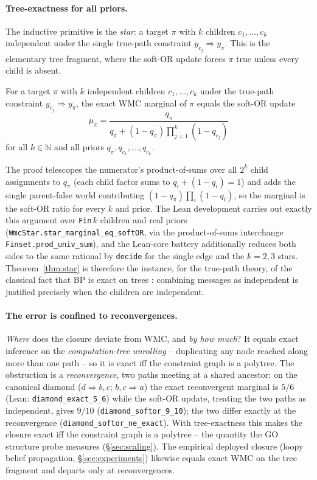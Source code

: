 \documentclass[anon]{nesy2026}
\begin{document}
\paragraph{Tree-exactness for all priors.}
The inductive primitive is the \emph{star}: a target $\pi$ with $k$ children $c_1,\dots,c_k$ independent under the single true-path constraint $y_{c_j}\!\Rightarrow\!y_\pi$. This is the elementary tree fragment, where the soft-OR update forces $\pi$ true unless every child is absent.

\begin{theorem}\label{thm:star}
For a target $\pi$ with $k$ independent children $c_1,\dots,c_k$ under the true-path constraint $y_{c_j}\!\Rightarrow\!y_\pi$, the exact WMC marginal of $\pi$ equals the soft-OR update
\[
\mu_\pi=\frac{q_\pi}{q_\pi+(1-q_\pi)\prod_{j=1}^{k}(1-q_{c_j})}
\]
for all $k\in\mathbb{N}$ and all priors $q_\pi,q_{c_1},\dots,q_{c_k}$.
\end{theorem}

The proof telescopes the numerator's product-of-sums over all $2^k$ child assignments to $q_\pi$ (each child factor sums to $q_i+(1-q_i)=1$) and adds the single parent-false world contributing $(1-q_\pi)\prod_i(1-q_i)$, so the marginal is the soft-OR ratio for every $k$ and prior. The Lean development carries out exactly this argument over \texttt{Fin}\,$k$ children and real priors (\texttt{WmcStar.star\_marginal\_eq\_softOR}, via the product-of-sums interchange \texttt{Finset.prod\_univ\_sum}), and the Lean-core battery additionally reduces both sides to the same rational by \texttt{decide} for the single edge and the $k{=}2,3$ stars. Theorem~\ref{thm:star} is therefore the instance, for the true-path theory, of the classical fact that BP is exact on trees \citep{pearl1988probabilistic}: combining messages as independent is justified precisely when the children are independent.

\paragraph{The error is confined to reconvergences.}
\emph{Where} does the closure deviate from WMC, and \emph{by how much}? It equals exact inference on the \emph{computation-tree unrolling} -- duplicating any node reached along more than one path -- so it is exact iff the constraint graph is a polytree. The obstruction is a \emph{reconvergence}, two paths meeting at a shared ancestor: on the canonical diamond ($d\!\Rightarrow\!b,c$; $b,c\!\Rightarrow\!a$) the exact reconvergent marginal is $5/6$ (Lean: \texttt{diamond\_exact\_5\_6}) while the soft-OR update, treating the two paths as independent, gives $9/10$ (\texttt{diamond\_softor\_9\_10}); the two differ exactly at the reconvergence (\texttt{diamond\_softor\_ne\_exact}). With tree-exactness this makes the closure exact iff the constraint graph is a polytree -- the quantity the GO structure probe measures (\S\ref{sec:scaling}). The empirical deployed closure (loopy belief propagation, \S\ref{sec:experiments}) likewise equals exact WMC on the tree fragment and departs only at reconvergences.
\end{document}
